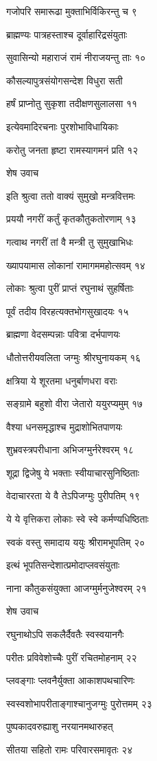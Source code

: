 गजोपरि समारूढा मुक्ताभिर्विकिरन्तु च ९

ब्राह्मण्यः पात्रहस्ताश्च दूर्वाहारिद्रसंयुताः

सुवासिन्यो महाराजं रामं नीराजयन्तु ताः १०

कौसल्यापुत्रसंयोगसन्देश विधुरा सती

हर्षं प्राप्नोतु सुकृशा तदीक्षणसुलालसा ११

इत्येवमादिरचनाः पुरशोभाविधायिकाः

करोतु जनता हृष्टा रामस्यागमनं प्रति १२

शेष उवाच

इति श्रुत्वा ततो वाक्यं सुमुखो मन्त्रवित्तमः

प्रययौ नगरीं कर्तुं कृतकौतुकतोरणाम् १३

गत्वाथ नगरीं तां वै मन्त्री तु सुमुखाभिधः

ख्यापयामास लोकानां रामागममहोत्सवम् १४

लोकाः श्रुत्वा पुरीं प्राप्तं रघुनाथं सुहर्षिताः

पूर्वं तदीय विरहत्यक्तभोगसुखादयः १५

ब्राह्मणा वेदसम्पन्नाः पवित्रा दर्भपाणयः

धौतोत्तरीयवलिता जग्मुः श्रीरघुनायकम् १६

क्षत्रिया ये शूरतमा धनुर्बाणधरा वराः

सङ्ग्रामे बहुशो वीरा जेतारो ययुरप्यमुम् १७

वैश्या धनसमृद्धाश्च मुद्राशोभितपाणयः

शुभ्रवस्त्रपरीधाना अभिजग्मुर्नरेश्वरम् १८

शूद्रा द्विजेषु ये भक्ताः स्वीयाचारसुनिष्ठिताः

वेदाचाररता ये वै तेऽपिजग्मुः पुरीपतिम् १९

ये ये वृत्तिकरा लोकाः स्वे स्वे कर्मण्यधिष्ठिताः

स्वकं वस्तु समादाय ययुः श्रीरामभूपतिम् २०

इत्थं भूपतिसन्देशात्प्रमोदाप्लवसंयुताः

नाना कौतुकसंयुक्ता आजग्मुर्मनुजेश्वरम् २१

शेष उवाच

रघुनाथोऽपि सकलैर्दैवतैः स्वस्वयानगैः

परीतः प्रविवेशोच्चैः पुरीं रचितमोहनाम् २२

प्लवङ्गाः प्लवनैर्युक्ता आकाशपथचारिणः

स्वस्वशोभापरीताङ्गाश्चानुजग्मुः पुरोत्तमम् २३

पुष्पकादवरुह्याशु नरयानमथारुहत्

सीतया सहितो रामः परिवारसमावृतः २४

